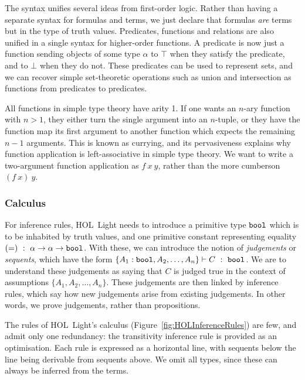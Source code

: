 The syntax unifies several ideas from first-order logic. Rather than having a separate syntax for formulas and terms, we just declare that formulas \emph{are} terms but in the type of truth values. Predicates, functions and relations are also unified in a single syntax for higher-order functions. A predicate is now just a function sending objects of some type $\alpha$ to $\top$ when they satisfy the predicate, and to $\bot$ when they do not. These predicates can be used to represent sets, and we can recover simple set-theoretic operations such as union and intersection as functions from predicates to predicates.

All functions in simple type theory have arity 1. If one wants an $n$-ary function with \mbox{$n>1$}, they either turn the single argument into an $n$-tuple, or they have the function map its first argument to another function which expects the remaining $n-1$ arguments. This is known as currying, and its pervasiveness explains why function application is left-associative in simple type theory. We want to write a two-argument function application as $f\ x\ y$, rather than the more cumberson $(f\ x)\ y$.

\subsubsection{Calculus}\label{sec:HOLInferenceRules}
For inference rules, HOL~Light needs to introduce a primitive type $\texttt{bool}$ which is to be inhabited by truth values, and one primitive constant representing equality \linebreak$(=)\ :\ \alpha \rightarrow \alpha \rightarrow \texttt{bool}$. With these, we can introduce the notion of \emph{judgements} or \emph{sequents}, which have the form $\{A_1:\code{bool},A_2,\ldots,A_n\} \vdash C\ :\ \code{bool}$. We are to understand these judgements as saying that $C$ is judged true in the context of assumptions $\{A_1,A_2,\ldots,A_n\}$. These judgements are then linked by inference rules, which say how new judgements arise from existing judgements. In other words, we prove judgements, rather than propositions.

The rules of HOL~Light's calculus (Figure~\ref{fig:HOLInferenceRules}) are few, and admit only one redundancy: the transitivity inference rule is provided as an optimisation. Each rule is expressed as a horizontal line, with sequents below the line being derivable from sequents above. We omit all types, since these can always be inferred from the terms.

